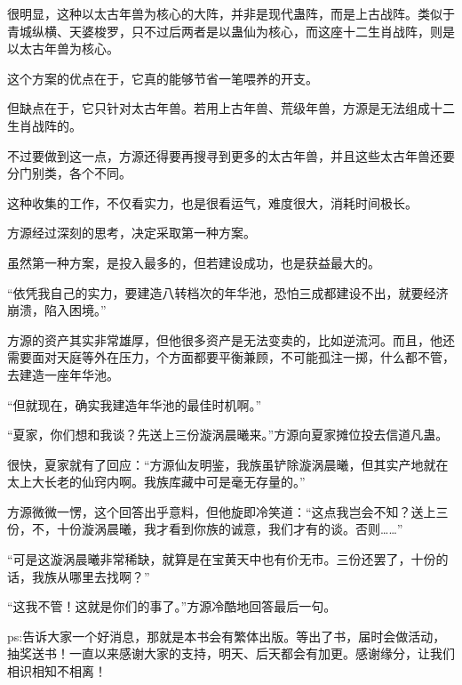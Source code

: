 \begin{this_body}
很明显，这种以太古年兽为核心的大阵，并非是现代蛊阵，而是上古战阵。类似于青城纵横、天婆梭罗，只不过后两者是以蛊仙为核心，而这座十二生肖战阵，则是以太古年兽为核心。

这个方案的优点在于，它真的能够节省一笔喂养的开支。

但缺点在于，它只针对太古年兽。若用上古年兽、荒级年兽，方源是无法组成十二生肖战阵的。

不过要做到这一点，方源还得要再搜寻到更多的太古年兽，并且这些太古年兽还要分门别类，各个不同。

这种收集的工作，不仅看实力，也是很看运气，难度很大，消耗时间极长。

方源经过深刻的思考，决定采取第一种方案。

虽然第一种方案，是投入最多的，但若建设成功，也是获益最大的。

“依凭我自己的实力，要建造八转档次的年华池，恐怕三成都建设不出，就要经济崩溃，陷入困境。”

方源的资产其实非常雄厚，但他很多资产是无法变卖的，比如逆流河。而且，他还需要面对天庭等外在压力，个方面都要平衡兼顾，不可能孤注一掷，什么都不管，去建造一座年华池。

“但就现在，确实我建造年华池的最佳时机啊。”

“夏家，你们想和我谈？先送上三份漩涡晨曦来。”方源向夏家摊位投去信道凡蛊。

很快，夏家就有了回应：“方源仙友明鉴，我族虽铲除漩涡晨曦，但其实产地就在太上大长老的仙窍内啊。我族库藏中可是毫无存量的。”

方源微微一愣，这个回答出乎意料，但他旋即冷笑道：“这点我岂会不知？送上三份，不，十份漩涡晨曦，我才看到你族的诚意，我们才有的谈。否则……”

“可是这漩涡晨曦非常稀缺，就算是在宝黄天中也有价无市。三份还罢了，十份的话，我族从哪里去找啊？”

“这我不管！这就是你们的事了。”方源冷酷地回答最后一句。

ps:告诉大家一个好消息，那就是本书会有繁体出版。等出了书，届时会做活动，抽奖送书！一直以来感谢大家的支持，明天、后天都会有加更。感谢缘分，让我们相识相知不相离！

\end{this_body}

